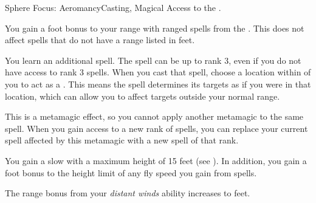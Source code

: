   \begin{magicalfeat}{Sphere Focus: Aeromancy}{Casting, Magical}
    \featpre Access to the  .

     You gain a  foot bonus to your range with ranged spells from the  .
    This does not affect spells that do not have a range listed in feet.

     You learn an additional spell.
    The spell can be up to rank 3, even if you do not have access to rank 3 spells.
    When you cast that spell, choose a location within \shortrange of you to act as a .
    This means the spell determines its targets as if you were in that location, which can allow you to affect targets outside your normal range.

    This is a metamagic effect, so you cannot apply another metamagic to the same spell.
    When you gain access to a new rank of spells, you can replace your current spell affected by this metamagic with a new spell of that rank.

     You gain a slow  with a maximum height of 15 feet (see ).
    In addition, you gain a  foot bonus to the height limit of any fly speed you gain from  spells.

     The range bonus from your \textit{distant winds} ability increases to  feet.
  \end{magicalfeat}

